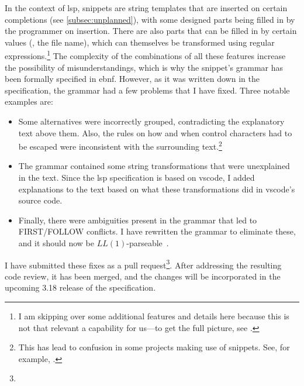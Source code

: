 \documentclass[../thesis]{subfiles}
\begin{document}
In the context of \gls{lsp}, snippets are string templates that are inserted on certain completions (see \cref{subsec:unplanned}), with some designed parts being filled in by the programmer on insertion.
There are also parts that can be filled in by certain values (\eg, the file name), which can themselves be transformed using regular expressions.\footnote{
	I am skipping over some additional features and details here because this is not that relevant a \gls{capability} for us---to get the full picture, see .
}
The complexity of the combinations of all these features increase the possibility of misunderstandings, which is why the snippet's grammar has been formally specified in \gls{ebnf}.
However, as it was written down in the specification, the grammar had a few problems that I have fixed.
Three notable examples are:
\begin{itemize}
	\item Some alternatives were incorrectly grouped, contradicting the explanatory text above them.
	      Also, the rules on how and when control characters had to be escaped were inconsistent with the surrounding text.\footnote{
		      This has lead to confusion in some projects making use of snippets.
		      See, for example, .
	      }
	\item The grammar contained some string transformations that were unexplained in the text.
	      Since the \gls{lsp} specification is based on \gls{vscode}, I added explanations to the text based on what these transformations did in \gls{vscode}'s source code.
	\item Finally, there were ambiguities present in the grammar that led to \textsf{FIRST}/\textsf{FOLLOW} conflicts.
	      I have rewritten the grammar to eliminate these, and it should now be $LL(1)$-parseable~\cite[222--224]{aho2007}.

\end{itemize}


I have submitted these fixes as a pull request\footnote{}.
After addressing the resulting code review, it has been merged, and the changes will be incorporated in the upcoming 3.18 release of the specification.
\end{document}

